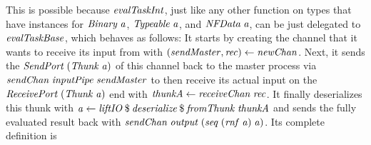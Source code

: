 \documentclass[paper=A4,twoside=true,openright,parskip=full,chapterprefix=true,headings=normal,bibliography=totoc,listof=totoc,titlepage=on,captions=tableabove,draft=false,british]{scrreprt}%
\begin{document}
This is possible because \ensuremath{\Varid{evalTaskInt}}, just like any other function on
types that have instances for \ensuremath{\Conid{Binary}\;\Varid{a}}, \ensuremath{\Conid{Typeable}\;\Varid{a}}, and \ensuremath{\Conid{NFData}\;\Varid{a}},
can be just delegated to \ensuremath{\Varid{evalTaskBase}}, which behaves as follows: It
starts by creating the channel that it wants to receive its input from
with \ensuremath{(\Varid{sendMaster},\Varid{rec})\leftarrow \Varid{newChan}}. Next, it sends the
\ensuremath{\Conid{SendPort}\;(\Conid{Thunk}\;\Varid{a})} of this channel back to the master process via
\ensuremath{\Varid{sendChan}\;\Varid{inputPipe}\;\Varid{sendMaster}} to then receive its actual input on the \linebreak
\ensuremath{\Conid{ReceivePort}\;(\Conid{Thunk}\;\Varid{a})} end with \ensuremath{\Varid{thunkA}\leftarrow \Varid{receiveChan}\;\Varid{rec}}. It finally
deserializes this thunk with
\ensuremath{\Varid{a}\leftarrow \Varid{liftIO}\mathbin{\$}\Varid{deserialize}\mathbin{\$}\Varid{fromThunk}\;\Varid{thunkA}} and sends the fully
evaluated result back with \ensuremath{\Varid{sendChan}\;\Varid{output}\;(\Varid{seq}\;(\Varid{rnf}\;\Varid{a})\;\Varid{a})}. Its
complete definition is
\end{document}
